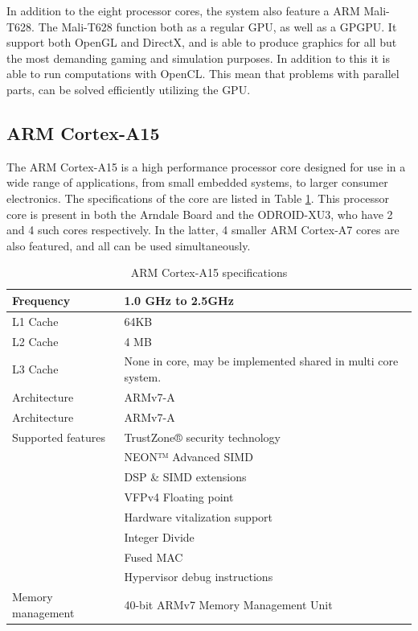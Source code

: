 In addition to the eight processor cores, the system also feature a ARM Mali-T628.
The Mali-T628 function both as a regular GPU, as well as a GPGPU.
It support both OpenGL and DirectX, and is able to produce graphics for all but the most demanding gaming and simulation purposes.
In addition to this it is able to run computations with OpenCL.
This mean that problems with parallel parts, can be solved efficiently utilizing the GPU.

\subsection{ARM Cortex-A15}
The ARM Cortex-A15 is a high performance processor core designed for use in a wide range of applications, from small embedded systems, to larger consumer electronics.
The specifications of the core are listed in Table \ref{A15}.
This processor core is present in both the Arndale Board and the ODROID-XU3, who have 2 and 4 such cores respectively.
In the latter, 4 smaller ARM Cortex-A7 cores are also featured, and all can be used simultaneously.
\begin{table}[H]
  \centering
  \begin{tabular}{ll}
    \toprule
    Frequency         & 1.0 GHz to 2.5GHz  \\
    \midrule
    L1 Cache          & 64KB \\
    L2 Cache          & 4 MB \\
    L3 Cache          & None in core, may be implemented shared in multi core system. \\Architecture      & ARMv7-A            \\
    \midrule
    Architecture      & ARMv7-A            \\
    \midrule
    Supported features& TrustZone® security technology \\
                      & NEON™ Advanced SIMD \\
                      & DSP \& SIMD extensions \\
                      & VFPv4 Floating point \\
                      & Hardware vitalization support \\
                      & Integer Divide \\
                      & Fused MAC \\
                      & Hypervisor debug instructions \\
    \midrule
    Memory management & 40-bit ARMv7 Memory Management Unit \\
    \bottomrule
  \end{tabular}
  \caption{ARM Cortex-A15 specifications\label{A15}}
\end{table}

